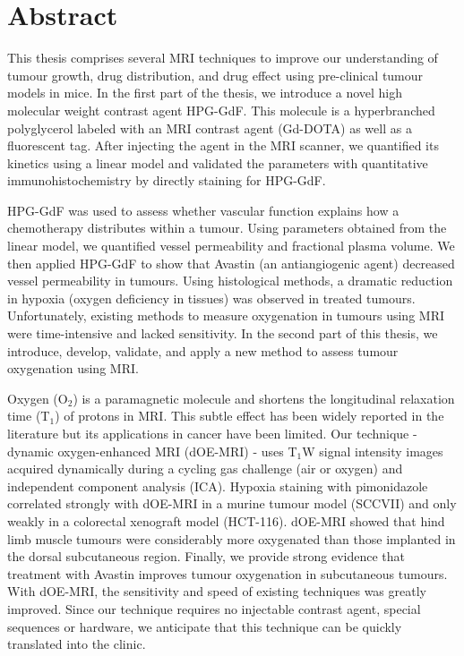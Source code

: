 
\chapter{Abstract}

This thesis comprises several MRI techniques to improve our understanding of tumour growth, drug distribution, and drug effect using pre-clinical tumour models in mice. In the first part of the thesis, we introduce a novel high molecular weight contrast agent HPG-GdF. This molecule is a hyperbranched polyglycerol labeled with an MRI contrast agent (Gd-DOTA) as well as a fluorescent tag. After injecting the agent in the MRI scanner, we quantified its kinetics using a linear model and validated the parameters with quantitative immunohistochemistry by directly staining for HPG-GdF.

HPG-GdF was used to assess whether vascular function explains how a chemotherapy distributes within a tumour. Using parameters obtained from the linear model, we quantified vessel permeability and fractional plasma volume. We then applied HPG-GdF to show that Avastin (an antiangiogenic agent) decreased vessel permeability in tumours. Using histological methods, a dramatic reduction in hypoxia (oxygen deficiency in tissues) was observed in treated tumours. Unfortunately, existing methods to measure oxygenation in tumours using MRI were time-intensive and lacked sensitivity. In the second part of this thesis, we introduce, develop, validate, and apply a new method to assess tumour oxygenation using MRI. 

Oxygen (O$_2$) is a paramagnetic molecule and shortens the longitudinal relaxation time (T$_1$) of protons in MRI. This subtle effect has been widely reported in the literature but its applications in cancer have been limited. Our technique - dynamic oxygen-enhanced MRI (\acs{dOE-MRI}) - uses T$_1$W signal intensity images acquired dynamically during a cycling gas challenge (air or oxygen) and independent component analysis (ICA). Hypoxia staining with pimonidazole correlated strongly with \acs{dOE-MRI} in a murine tumour model (SCCVII) and only weakly in a colorectal xenograft model (HCT-116). \acs{dOE-MRI} showed that hind limb muscle tumours were considerably more oxygenated than those implanted in the dorsal subcutaneous region. Finally, we provide strong evidence that treatment with Avastin improves tumour oxygenation in subcutaneous tumours. With \acs{dOE-MRI}, the sensitivity and speed of existing techniques was greatly improved. Since our technique requires no injectable contrast agent, special sequences or hardware, we anticipate that this technique can be quickly translated into the clinic. 


